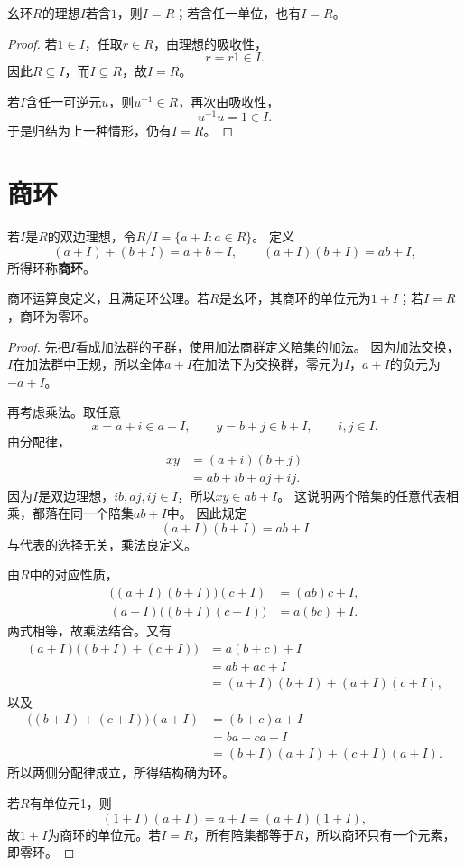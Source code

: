 \begin{proposition}
幺环$R$的理想$I$若含$1$，则$I=R$；若含任一单位，也有$I=R$。
\end{proposition}
\begin{proof}
若$1\in I$，任取$r\in R$，由理想的吸收性，
\[
r=r1\in I.
\]
因此$R\subseteq I$，而$I\subseteq R$，故$I=R$。

若$I$含任一可逆元$u$，则$u^{-1}\in R$，再次由吸收性，
\[
u^{-1}u=1\in I.
\]
于是归结为上一种情形，仍有$I=R$。
\end{proof}
\section{商环}
\begin{definition}
若$I$是$R$的双边理想，令$R/I=\{a+I:a\in R\}$。
定义
\[
(a+I)+(b+I)=a+b+I,\qquad(a+I)(b+I)=ab+I,
\]
所得环称\textbf{商环}。
\end{definition}

\begin{proposition}
商环运算良定义，且满足环公理。若$R$是幺环，其商环的单位元为$1+I$；若$I=R$，商环为零环。
\end{proposition}
\begin{proof}
先把$I$看成加法群的子群，使用加法商群定义陪集的加法。
因为加法交换，$I$在加法群中正规，所以全体$a+I$在加法下为交换群，零元为$I$，$a+I$的负元为$-a+I$。

再考虑乘法。取任意
\[
x=a+i\in a+I,\qquad y=b+j\in b+I,
\qquad i,j\in I.
\]
由分配律，
\[
\begin{aligned}
xy
&=(a+i)(b+j)\\
&=ab+ib+aj+ij.
\end{aligned}
\]
因为$I$是双边理想，$ib,aj,ij\in I$，所以$xy\in ab+I$。
这说明两个陪集的任意代表相乘，都落在同一个陪集$ab+I$中。
因此规定
\[
(a+I)(b+I)=ab+I
\]
与代表的选择无关，乘法良定义。

由$R$中的对应性质，
\[
\begin{aligned}
\bigl((a+I)(b+I)\bigr)(c+I)&=(ab)c+I,\\
(a+I)\bigl((b+I)(c+I)\bigr)&=a(bc)+I.
\end{aligned}
\]
两式相等，故乘法结合。又有
\[
\begin{aligned}
(a+I)\bigl((b+I)+(c+I)\bigr)
&=a(b+c)+I\\
&=ab+ac+I\\
&=(a+I)(b+I)+(a+I)(c+I),
\end{aligned}
\]
以及
\[
\begin{aligned}
\bigl((b+I)+(c+I)\bigr)(a+I)
&=(b+c)a+I\\
&=ba+ca+I\\
&=(b+I)(a+I)+(c+I)(a+I).
\end{aligned}
\]
所以两侧分配律成立，所得结构确为环。

若$R$有单位元1，则
\[
(1+I)(a+I)=a+I=(a+I)(1+I),
\]
故$1+I$为商环的单位元。若$I=R$，所有陪集都等于$R$，所以商环只有一个元素，即零环。
\end{proof}

